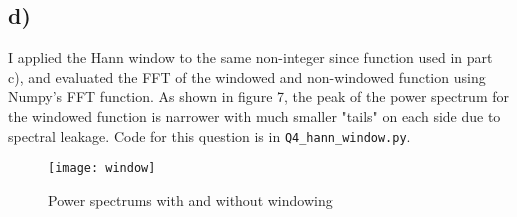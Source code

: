 \documentclass{article}
\newcommand{\<}[1]{\left\langle #1 \right\rangle }
\begin{document}
\subsection{d)}
I applied the Hann window to the same non-integer since function used in part c), and evaluated the FFT of the windowed and non-windowed function using Numpy's FFT function. As shown in figure 7, the peak of the power spectrum for the windowed function is narrower with much smaller "tails" on each side due to spectral leakage. Code for this question is in \texttt{Q4\_hann\_window.py}.

\begin{figure}[h]
	\caption{Power spectrums with and without windowing}
	\centering
	\texttt{[image: window]}
\end{figure}	





	
\end{document}
